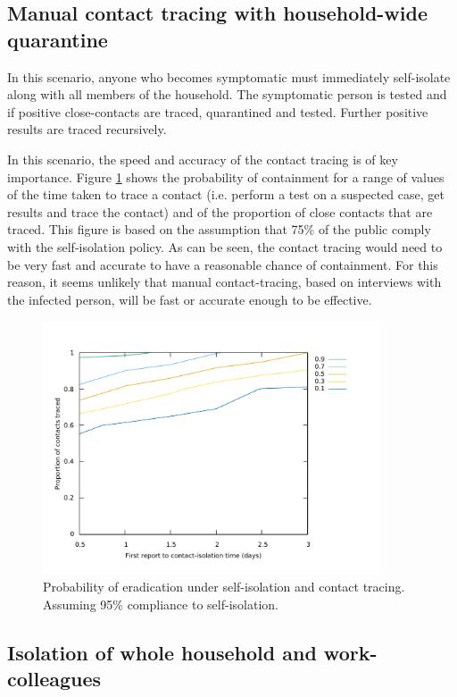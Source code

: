 \documentclass{article}
\begin{document}
\subsection{Manual contact tracing with household-wide quarantine}

In this scenario, anyone who becomes symptomatic must immediately self-isolate along with all members of the household. The symptomatic person is tested and if positive close-contacts are traced, quarantined and tested. Further positive results are traced recursively.

In this scenario, the speed and accuracy of the contact tracing is of key importance. Figure \ref{tracingContour} shows the probability of containment for a range of values of the time taken to trace a contact (i.e. perform a test on a suspected case, get results and trace the contact) and of the proportion of close contacts that are traced. This figure is based on the assumption that 75\% of the public comply with the self-isolation policy. As can be seen, the contact tracing would need to be very fast and accurate to have a reasonable chance of containment. For this reason, it seems unlikely that manual contact-tracing, based on interviews with the infected person, will be fast or accurate enough to be effective.

\begin{figure}
\begin{center}
\includegraphics[width = 10cm]{tracingContour.pdf}
\end{center}
\caption{Probability of eradication under self-isolation and contact tracing. Assuming 95\% compliance to self-isolation.}
\label{tracingContour}
\end{figure}

\subsection{Isolation of whole household and work-colleagues}
\end{document}
